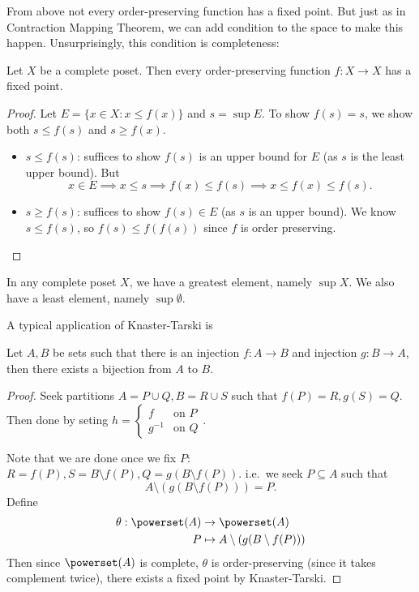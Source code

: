 \documentclass[a4paper]{article}
\begin{document}
From above not every order-preserving function has a fixed point. But just as in Contraction Mapping Theorem, we can add condition to the space to make this happen. Unsurprisingly, this condition is completeness:

\begin{theorem}
  \label{thm:Knaster-Tarski}
  Let \(X\) be a complete poset. Then every order-preserving function \(f: X \to X\) has a fixed point.
\end{theorem}

\begin{proof}
  Let \(E = \{x \in X: x \leq f(x)\}\) and \(s = \sup E\). To show \(f(s) = s\), we show both \(s \leq f(s)\) and \(s \geq f(x)\).
  \begin{itemize}
  \item \(s \leq f(s)\): suffices to show \(f(s)\) is an upper bound for \(E\) (as \(s\) is the least upper bound). But
    \[
      x \in E \implies x \leq s \implies f(x) \leq f(s) \implies x \leq f(x) \leq f(s).
    \]
  \item \(s \geq f(s)\): suffices to show \(f(s) \in E\) (as \(s\) is an upper bound). We know \(s \leq f(s)\), so \(f(s) \leq f(f(s))\) since \(f\) is order preserving.
  \end{itemize}
\end{proof}

\begin{note}
  In any complete poset \(X\), we have a greatest element, namely \(\sup X\). We also have a least element, namely \(\sup \emptyset\).
\end{note}

A typical application of Knaster-Tarski is

\begin{theorem}
  Let \(A, B\) be sets such that there is an injection \(f: A \to B\) and injection \(g: B \to A\), then there exists a bijection from \(A\) to \(B\).
\end{theorem}

\begin{proof}
  Seek partitions \(A = P \cup Q, B = R \cup S\) such that \(f(P) = R, g(S) = Q\). Then done by seting \(h = \begin{cases} f & \text{on } P \\ g^{-1} & \text{on } Q \end{cases}\).

  Note that we are done once we fix \(P\): \(R = f(P), S = B \setminus f(P), Q = g(B \setminus f(P))\). i.e.\ we seek \(P \subseteq A\) such that
  \[
    A \setminus (g(B \setminus f(P))) = P.
  \]
  Define
  \begin{align*}
    \theta: \powerset(A) &\to \powerset(A) \\
    P &\mapsto A \setminus (g(B \setminus f(P)))
  \end{align*}
  Then since \(\powerset(A)\) is complete, \(\theta\) is order-preserving (since it takes complement twice), there exists a fixed point by Knaster-Tarski.
\end{proof}
\end{document}
